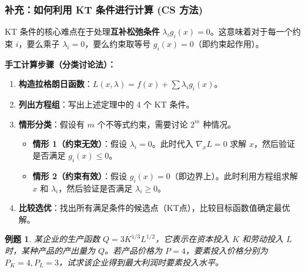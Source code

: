 \documentclass[a4paper,12pt]{ctexart} %
\newtheorem{example}{例题}[section]
\begin{document}
	\subsubsection*{补充：如何利用 KT 条件进行计算 (CS 方法)}
	KT 条件的核心难点在于处理\textbf{互补松弛条件} $\lambda_i g_i(x) = 0$。这意味着对于每一个约束 $i$，要么乘子 $\lambda_i = 0$，要么约束取等号 $g_i(x) = 0$（即约束起作用）。
	
	\textbf{手工计算步骤（分类讨论法）：}
	\begin{enumerate}
		\item \textbf{构造拉格朗日函数}：$L(x, \lambda) = f(x) + \sum \lambda_i g_i(x)$。
		\item \textbf{列出方程组}：写出上述定理中的 4 个 KT 条件。
		\item \textbf{情形分类}：假设有 $m$ 个不等式约束，需要讨论 $2^m$ 种情况。
		\begin{itemize}
			\item \textbf{情形 1（约束无效）}：假设 $\lambda_i = 0$。此时代入 $\nabla_x L = 0$ 求解 $x$，然后验证是否满足 $g_i(x) \le 0$。
			\item \textbf{情形 2（约束有效）}：假设 $g_i(x) = 0$（即边界上）。此时利用方程组求解 $x$ 和 $\lambda_i$，然后验证是否满足 $\lambda_i \ge 0$。
		\end{itemize}
		\item \textbf{比较选优}：找出所有满足条件的候选点（KT点），比较目标函数值确定最优解。
	\end{enumerate}
	
	
	\begin{example}
		某企业的生产函数 $Q = 3K^{1/3}L^{1/2}$，它表示在资本投入 $K$ 和劳动投入 $L$ 时，某种产品的产出量为 $Q$。若产品价格为 $P=4$，要素投入价格分别为 $P_K=4, P_L=3$，试求该企业得到最大利润时要素投入水平。
	\end{example}
	
\end{document}

